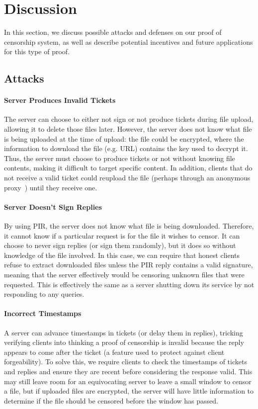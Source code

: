 \section{Discussion}\label{sec:poc-discussion}

In this section, we discuss possible attacks and defenses on our proof of
censorship system, as well as describe potential incentives and future
applications for this type of proof.

\subsection{Attacks}

\paragraph{Server Produces Invalid Tickets} The server can choose to either not
sign or not produce tickets during file upload, allowing it to delete those
files later. However, the server does not know what file is being uploaded at
the time of upload: the file could be encrypted, where the information to
download the file (e.g. URL) contains the key used to decrypt it. Thus, the server must
choose to produce tickets or not without knowing file contents, making it
difficult to target specific content. In addition, clients that do not receive a
valid ticket could reupload the file (perhaps through an anonymous
proxy~\cite{tor}) until they receive one.

\paragraph{Server Doesn't Sign Replies} By using PIR, the server does not know
what file is being downloaded. Therefore, it cannot know if a particular request
is for the file it wishes to censor. It can choose to never sign replies (or
sign them randomly), but it does so without knowledge of the file involved. In
this case, we can require that honest clients refuse to extract downloaded files
unless the PIR reply contains a valid signature, meaning that the server
effectively would be censoring unknown files that were requested. This is
effectively the same as a server shutting down its service by not responding to
any queries.

\paragraph{Incorrect Timestamps} A server can advance timestamps in tickets
(or delay them in replies), tricking verifying clients into thinking a
proof of censorship is invalid because the reply appears to come after the
ticket (a feature used to protect against client forgeability). To solve this,
we require clients to check the timestamps of tickets and replies and ensure
they are recent before considering the response valid. This may still leave room
for an equivocating server to leave a small window to censor a file, but if
uploaded files are encrypted, the server will have little information to
determine if the file should be censored before the window has passed.

